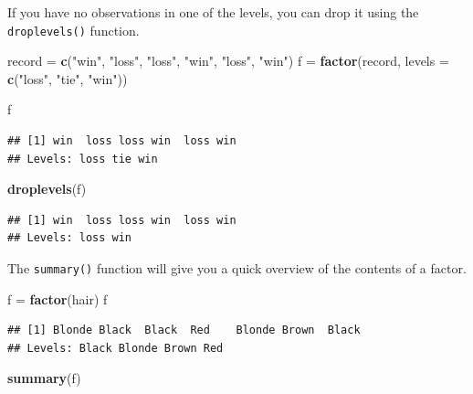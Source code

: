 \documentclass[
]{book}
\newenvironment{Shaded}{\begin{snugshade}}{\end{snugshade}}
\newcommand{\DataTypeTok}[1]{\textcolor[rgb]{0.13,0.29,0.53}{#1}}
\newcommand{\KeywordTok}[1]{\textcolor[rgb]{0.13,0.29,0.53}{\textbf{#1}}}
\newcommand{\NormalTok}[1]{#1}
\newcommand{\StringTok}[1]{\textcolor[rgb]{0.31,0.60,0.02}{#1}}
\begin{document}
If you have no observations in one of the levels, you can drop it using the \texttt{droplevels()} function.

\begin{Shaded}
\begin{Highlighting}[]
\NormalTok{record =}\StringTok{ }\KeywordTok{c}\NormalTok{(}\StringTok{"win"}\NormalTok{, }\StringTok{"loss"}\NormalTok{, }\StringTok{"loss"}\NormalTok{, }\StringTok{"win"}\NormalTok{, }\StringTok{"loss"}\NormalTok{, }\StringTok{"win"}\NormalTok{)}
\NormalTok{f =}\StringTok{ }\KeywordTok{factor}\NormalTok{(record,}
            \DataTypeTok{levels =} \KeywordTok{c}\NormalTok{(}\StringTok{"loss"}\NormalTok{, }\StringTok{"tie"}\NormalTok{, }\StringTok{"win"}\NormalTok{))}

\NormalTok{f}
\end{Highlighting}
\end{Shaded}

\begin{verbatim}
## [1] win  loss loss win  loss win 
## Levels: loss tie win
\end{verbatim}

\begin{Shaded}
\begin{Highlighting}[]
\KeywordTok{droplevels}\NormalTok{(f)}
\end{Highlighting}
\end{Shaded}

\begin{verbatim}
## [1] win  loss loss win  loss win 
## Levels: loss win
\end{verbatim}

The \texttt{summary()} function will give you a quick overview of the contents of a factor.

\begin{Shaded}
\begin{Highlighting}[]
\NormalTok{f =}\StringTok{ }\KeywordTok{factor}\NormalTok{(hair)}
\NormalTok{f}
\end{Highlighting}
\end{Shaded}

\begin{verbatim}
## [1] Blonde Black  Black  Red    Blonde Brown  Black 
## Levels: Black Blonde Brown Red
\end{verbatim}

\begin{Shaded}
\begin{Highlighting}[]
\KeywordTok{summary}\NormalTok{(f)}
\end{Highlighting}
\end{Shaded}
\end{document}
